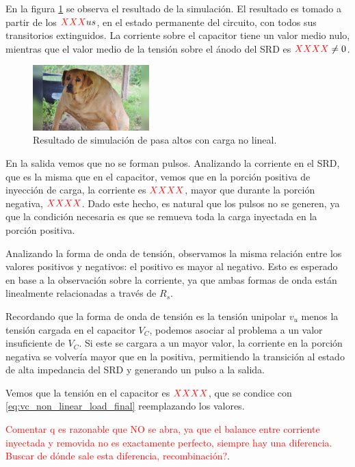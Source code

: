 En la figura \ref{fig:highpass_non_linear_simulation_result} se observa el
resultado de la simulación. El resultado es tomado a partir de los
$\textcolor{red}{XXX} us$, en el estado permanente del circuito, con todos sus
transitorios extinguidos. La corriente sobre el capacitor tiene un valor medio
nulo, mientras que el valor medio de la tensión sobre el ánodo del SRD es
$\textcolor{red}{XXXX} \neq 0$.

\begin{figure}[tbp]
    \centering
    \includegraphics[width=0.4\textwidth]{images/placeholder.jpg}
    \caption{Resultado de simulación de pasa altos con carga no lineal.}
    \label{fig:highpass_non_linear_simulation_result}
\end{figure}

En la salida vemos que no se forman pulsos. Analizando la corriente en el SRD,
que es la misma que en el capacitor, vemos que en la porción positiva de
inyección de carga, la corriente es $\textcolor{red}{XXXX}$, mayor que durante
la porción negativa, $\textcolor{red}{XXXX}$. Dado este hecho, es natural que
los pulsos no se generen, ya que la condición necesaria es que se remueva toda
la carga inyectada en la porción positiva.

Analizando la forma de onda de tensión, observamos la misma relación entre los
valores positivos y negativos: el positivo es mayor al negativo. Esto es
esperado en base a la observación sobre la corriente, ya que ambas formas de
onda están linealmente relacionadas a través de $R_s$.

Recordando que la forma de onda de tensión es la tensión unipolar $v_u$ menos la
tensión cargada en el capacitor $V_C$, podemos asociar al problema a un valor
insuficiente de $V_C$. Si este se cargara a un mayor valor, la corriente en la
porción negativa se volvería mayor que en la positiva, permitiendo la transición
al estado de alta impedancia del SRD y generando un pulso a la salida.

Vemos que la tensión en el capacitor es $\textcolor{red}{XXXX}$, que se condice
con \ref{eq:vc_non_linear_load_final} reemplazando los valores.

\textcolor{red}{Comentar q es razonable que NO se abra, ya que el balance entre
corriente inyectada y removida no es exactamente perfecto, siempre hay una
diferencia. Buscar de dónde sale esta diferencia, recombinación?}.

